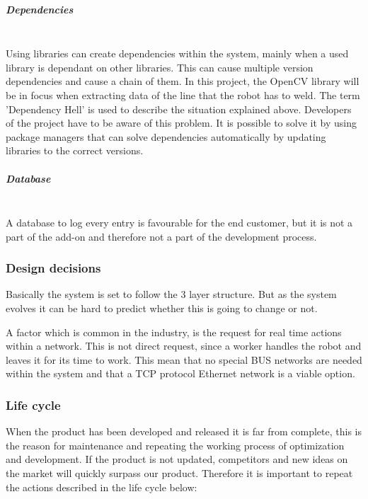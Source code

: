 \subparagraph*{Dependencies}~\\
Using libraries can create dependencies within the system, mainly when a used library is dependant on other libraries. This can cause multiple version dependencies and cause a chain of them. In this project, the OpenCV library will be in focus when extracting data of the line that the robot has to weld. The term 'Dependency Hell' is used to describe the situation explained above. Developers of the project have to be aware of this problem. It is possible to solve it by using package managers that can solve dependencies automatically by updating libraries to the correct versions. 

\subparagraph*{Database}~\\
A database to log every entry is favourable for the end customer, but it is not a part of the add-on and therefore not a part of the development process.

\subsubsection{Design decisions}
Basically the system is set to follow the 3 layer structure. But as the system evolves it can be hard to predict whether this is going to change or not. 


A factor which is common in the industry, is the request for real time actions within a network. This is not direct request, since a worker handles the robot and leaves it for its time to work. This mean that no special BUS networks are needed within the system and that a TCP protocol Ethernet network is a viable option. 

\subsubsection{Life cycle}

When the product has been developed and released it is far from complete, this is the reason for maintenance and repeating the working process of optimization and development. If the product is not updated, competitors and new ideas on the market will quickly surpass our product. Therefore it is important to repeat the actions described in the life cycle below:
\clearpage

